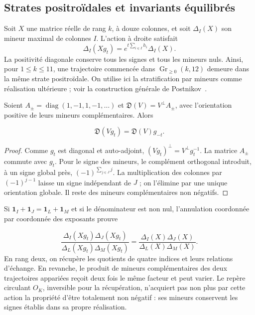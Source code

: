 \subsection{Strates positroïdales et invariants équilibrés}

Soit \(X\) une matrice réelle de rang \(k\), à douze colonnes, et soit \(\Delta_I(X)\) son mineur maximal de colonnes \(I\). L'action à droite satisfait
\begin{equation}
 \Delta_I(Xg_t)=e^{t\sum_{i\in I}h_i}\Delta_I(X).
 \label{rec:eq:plucker}
\end{equation}
La positivité diagonale conserve tous les signes et tous les mineurs nuls. Ainsi, pour \(1\le k\le11\), une trajectoire commencée dans \(\operatorname{Gr}_{\ge0}(k,12)\) demeure dans la même strate positroïdale. On utilise ici la stratification par mineurs comme réalisation ultérieure ; voir la construction générale de Postnikov~\cite{rec:postnikov}.

\begin{proposition}
Soient \(A_{\pm}=\operatorname{diag}(1,-1,1,-1,\ldots)\) et
\(\mathfrak D(V)=V^\perp A_{\pm}\), avec l’orientation positive de leurs mineurs complémentaires. Alors

\[
 \mathfrak D(Vg_t)=\mathfrak D(V)g_{-t}.
\]
\end{proposition}
\begin{proof}
Comme \(g_t\) est diagonal et auto-adjoint,
\((Vg_t)^\perp=V^\perp g_t^{-1}\). La matrice \(A_{\pm}\) commute avec \(g_t\). Pour le signe des mineurs, le complément orthogonal introduit, à un signe global près, \((-1)^{\sum_{j\in J}j}\). La multiplication des colonnes par \((-1)^{j-1}\) laisse un signe indépendant de \(J\) ; on l’élimine par une unique orientation globale. Il reste des mineurs complémentaires non négatifs.
\end{proof}

Si \(\mathbf1_I+\mathbf1_J=\mathbf1_L+\mathbf1_M\) et si le dénominateur est non nul, l’annulation coordonnée par coordonnée des exposants prouve

\begin{equation}
 \frac{\Delta_I(Xg_t)\Delta_J(Xg_t)}{\Delta_L(Xg_t)\Delta_M(Xg_t)}
 =\frac{\Delta_I(X)\Delta_J(X)}{\Delta_L(X)\Delta_M(X)}.
 \label{rec:eq:cocientes}
\end{equation}
En rang deux, on récupère les quotients de quatre indices et leurs relations d'échange. En revanche, le produit de mineurs complémentaires des deux trajectoires appariées reçoit deux fois le même facteur et peut varier. Le repère circulant \(O_K\), inversible pour la récupération, n'acquiert pas non plus par cette action la propriété d'être totalement non négatif : ses mineurs conservent les signes établis dans sa propre réalisation.


